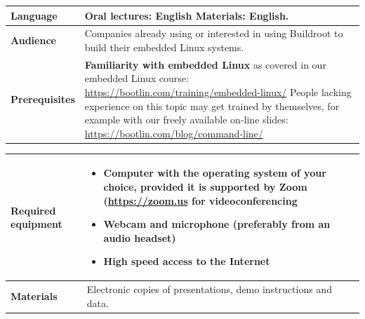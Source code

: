 \documentclass[a4paper,12pt,obeyspaces,spaces,hyphens]{article}
\begin{document}
{\begin{tabularx}{\textwidth}{|g|h|}
    {\bf Language} & Oral lectures: English
    \newline Materials: English.\\
    \hline

    {\bf Audience} & Companies already using or interested in using
    Buildroot to build their embedded Linux systems.\\
    \hline

    {\bf Prerequisites} & {\bf Familiarity with embedded Linux} as covered
    in our embedded Linux course:
    \newline \url{https://bootlin.com/training/embedded-linux/} \vspace{1em}
    \newline People lacking experience on this topic may get
    trained by themselves, for example with our freely available
    on-line slides:
    \newline \url{https://bootlin.com/blog/command-line/} \\
    \hline
  \end{tabularx}

  \begin{tabularx}{\textwidth}{|g|h|}
    {\bf Required equipment} &
    \begin{itemize}
    \item Computer with the operating system of your choice, provided
    it is supported by Zoom (\url{https://zoom.us} for videoconferencing
    \item Webcam and microphone (preferably from an audio headset)
    \item High speed access to the Internet
    \end{itemize}\\
    \hline

    {\bf Materials} & Electronic copies of presentations,
    demo instructions and data.\\
    \hline

\end{tabularx}}
\normalsize
\end{document}
